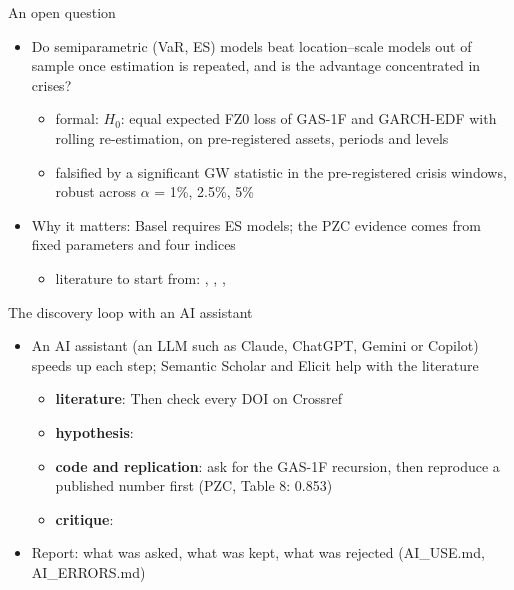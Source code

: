 \begin{frame}{An open question}
\itemsize{\small}
\begin{itemize}
    \item Do semiparametric (VaR, ES) models beat location--scale models out of sample once estimation is repeated, and is the advantage concentrated in crises?
    \begin{itemize}
        \item formal: $H_0$: equal expected FZ0 loss of GAS-1F and GARCH-EDF with rolling re-estimation, on pre-registered assets, periods and levels
        \item falsified by a significant GW statistic in the pre-registered crisis windows, robust across $\alpha$ = 1\%, 2.5\%, 5\%
    \end{itemize}
    \item Why it matters: Basel requires ES models; the PZC evidence comes from fixed parameters and four indices
    \begin{itemize}
        \item literature to start from: , , , 
    \end{itemize}
\end{itemize}
\end{frame}

\begin{frame}{The discovery loop with an AI assistant}
\itemsize{\footnotesize}
\begin{itemize}
    \item An AI assistant (an LLM such as Claude, ChatGPT, Gemini or Copilot) speeds up each step; Semantic Scholar and Elicit help with the literature
    \begin{itemize}
        \item \textbf{literature}:  Then check every DOI on Crossref
        \item \textbf{hypothesis}: 
        \item \textbf{code and replication}: ask for the GAS-1F recursion, then reproduce a published number first (PZC, Table 8: 0.853)
        \item \textbf{critique}: 
    \end{itemize}
    \item Report: what was asked, what was kept, what was rejected (AI\_USE.md, AI\_ERRORS.md)
\end{itemize}
\end{frame}

